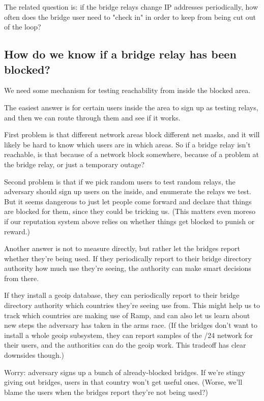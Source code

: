 \documentclass{llncs}
\begin{document}
The related question is: if the bridge relays change IP addresses
periodically, how often does the bridge user need to "check in" in order
to keep from being cut out of the loop?

\subsection{How do we know if a bridge relay has been blocked?}

We need some mechanism for testing reachability from inside the
blocked area.

The easiest answer is for certain users inside the area to sign up as
testing relays, and then we can route through them and see if it works.

First problem is that different network areas block different net masks,
and it will likely be hard to know which users are in which areas. So
if a bridge relay isn't reachable, is that because of a network block
somewhere, because of a problem at the bridge relay, or just a temporary
outage?

Second problem is that if we pick random users to test random relays, the
adversary should sign up users on the inside, and enumerate the relays
we test. But it seems dangerous to just let people come forward and
declare that things are blocked for them, since they could be tricking
us. (This matters even moreso if our reputation system above relies on
whether things get blocked to punish or reward.)

Another answer is not to measure directly, but rather let the bridges
report whether they're being used. If they periodically report to their
bridge directory authority how much use they're seeing, the authority
can make smart decisions from there.

If they install a geoip database, they can periodically report to their
bridge directory authority which countries they're seeing use from. This
might help us to track which countries are making use of Ramp, and can
also let us learn about new steps the adversary has taken in the arms
race. (If the bridges don't want to install a whole geoip subsystem, they
can report samples of the /24 network for their users, and the authorities
can do the geoip work. This tradeoff has clear downsides though.)

Worry: adversary signs up a bunch of already-blocked bridges. If we're
stingy giving out bridges, users in that country won't get useful ones.
(Worse, we'll blame the users when the bridges report they're not
being used?)
\end{document}
